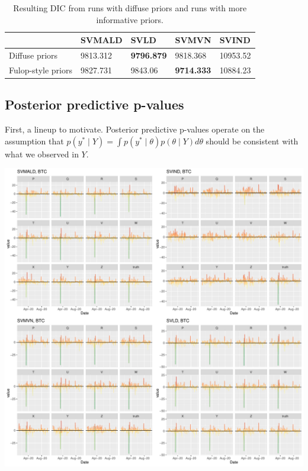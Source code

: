 \documentclass{article}\usepackage[]{graphicx}\usepackage[]{color}
\begin{document}
\begin{table}[h!]
\begin{tabular}{|l|l|l|l|l|}
\hline
                   & SVMALD  & SVLD    & SVMVN   & SVIND \\ \hline
Diffuse priors     &9813.312 &\textbf{9796.879} &9818.368 &10953.52 \\ \hline
Fulop-style priors &9827.731 &9843.06 &\textbf{9714.333} &10884.23 \\ \hline
\end{tabular}
\caption{\label{tab:dic7} Resulting DIC from runs with diffuse priors and runs with more informative priors. }
\end{table}
 

\subsection{Posterior predictive p-values}

First, a lineup to motivate. Posterior predictive p-values operate on the assumption that $p(y^* \mid Y) = \int p(y^* \mid \theta)p(\theta \mid Y) d \theta$ should be consistent with what we observed in $Y$.

\includegraphics[width = .9\linewidth]{"lineup_BTC.pdf"}

\newpage
\clearpage
\end{document}
